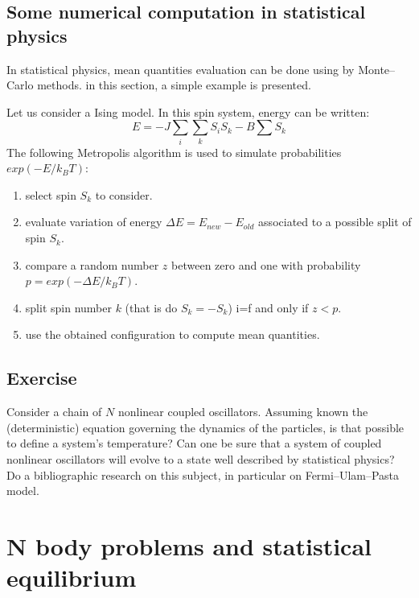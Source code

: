 \documentclass[12pt]{book}
\begin{document}
\section{Some numerical computation in statistical physics}
In statistical physics, mean quantities evaluation can be done using by
Monte--Carlo methods. in this section, a simple example is presented.
\begin{exmp}
Let us consider a Ising model. In this spin system, energy can be written:
\begin{equation}
E=-J\sum_i\sum_k S_iS_k-B\sum S_k
\end{equation}
The following Metropolis algorithm\cite{ma:compu:Stauffer93,ma:compu:Koonin90}
is used  
to simulate probabilities $exp(-E/k_BT)$:
\begin{enumerate}
\item select spin $S_k$ to consider.
\item evaluate variation of energy $\Delta E=E_{new}-E_{old}$ associated
  to a possible split of spin $S_k$.
\item compare a random number $z$ between zero and one with probability $p=exp(-\Delta E/k_BT)$.
\item split spin number $k$ (that is do $S_k=-S_k$) i=f and only if $z<p$.
\item use the obtained configuration to compute mean quantities.
\end{enumerate}
\end{exmp}



\section{Exercise}

\begin{exo}
Consider a chain of $N$ nonlinear coupled oscillators. Assuming known the
(deterministic) equation governing the dynamics of the particles, is that
possible to define a system's temperature? Can one be sure that a system of
coupled nonlinear oscillators will evolve to a state well described by
statistical physics? Do a bibliographic research on this subject, in
particular on Fermi--Ulam--Pasta model.
\end{exo}



\chapter{N body problems and statistical equilibrium}\label{chapNcorpsstat} 
\end{document}
